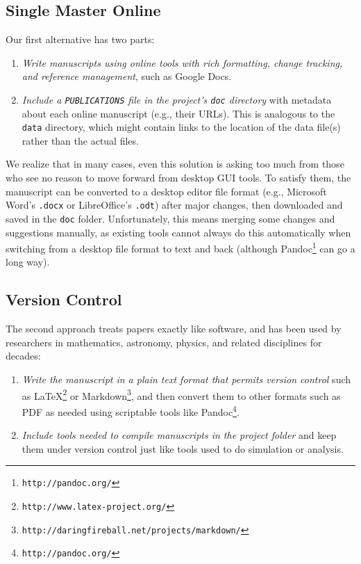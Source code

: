 \documentclass[10pt]{article}
\newcommand{\recommend}[1]{\textit{#1}}
\newcommand{\withurl}[2]{{#1}\footnote{\texttt{#2}}}
\begin{document}
\subsection*{Single Master Online}

Our first alternative has two parts:

\begin{enumerate}

\item
  \recommend{Write manuscripts using online tools with rich
    formatting, change tracking, and reference management}, such as
  Google Docs.

\item
  \recommend{Include a \texttt{PUBLICATIONS} file in the project's
    \texttt{doc} directory} with metadata about each online manuscript
  (e.g., their URLs). This is analogous to the \texttt{data}
  directory, which might contain links to the location of the data
  file(s) rather than the actual files.

\end{enumerate}

We realize that in many cases, even this solution is asking too much
from those who see no reason to move forward from desktop GUI
tools. To satisfy them, the manuscript can be converted to a desktop
editor file format (e.g., Microsoft Word's \texttt{.docx} or
LibreOffice's \texttt{.odt}) after major changes, then downloaded and
saved in the \texttt{doc} folder. Unfortunately, this means merging
some changes and suggestions manually, as existing tools cannot always
do this automatically when switching from a desktop file format to
text and back (although \withurl{Pandoc}{http://pandoc.org/} can go a
long way).

\subsection*{Version Control}

The second approach treats papers exactly like software, and has been
used by researchers in mathematics, astronomy, physics, and related
disciplines for decades:

\begin{enumerate}

\item
  \recommend{Write the manuscript in a plain text format that permits
    version control} such as
  \withurl{LaTeX}{http://www.latex-project.org/} or
  \withurl{Markdown}{http://daringfireball.net/projects/markdown/},
  and then convert them to other formats such as PDF as needed using
  scriptable tools like \withurl{Pandoc}{http://pandoc.org/}.

\item
  \recommend{Include tools needed to compile manuscripts in the
    project folder} and keep them under version control just like
  tools used to do simulation or analysis.

\end{enumerate}
\end{document}
